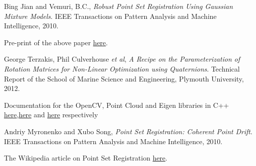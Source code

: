\documentclass[11pt, a4paper]{article}
\begin{document}
\begin{thebibliography}{9}

  Bing Jian and Vemuri, B.C.,
  \emph{Robust Point Set Registration Using Gaussian Mixture Models}.
  IEEE Transactions on Pattern Analysis and Machine Intelligence,
  2010.
  
  Pre-print of the above paper \href{http://code.google.com/p/gmmreg/downloads/detail?name=gmmreg_PAMI_preprint.pdf}{here}.
  
  George Terzakis, Phil Culverhouse \textit{et al},
  \emph{A Recipe on the Parameterization of Rotation Matrices for Non-Linear Optimization using Quaternions}.
  Technical Report of the School of Marine Science and Engineering, Plymouth University,
  2012.
  
  Documentation for the OpenCV, Point Cloud and Eigen libraries in C++ \href{http://docs.opencv.org/}{here},\href{http://pointclouds.org/documentation/}{here} and \href{http://eigen.tuxfamily.org/dox/}{here} respectively

  Andriy Myronenko and Xubo Song,
  \emph{Point Set Registration: Coherent Point Drift}.
  IEEE Transactions on Pattern Analysis and Machine Intelligence,
  2010.

  The Wikipedia article on Point Set Registration \href{http://en.wikipedia.org/wiki/Point_set_registration}{here}.

\end{thebibliography}
\end{document}

